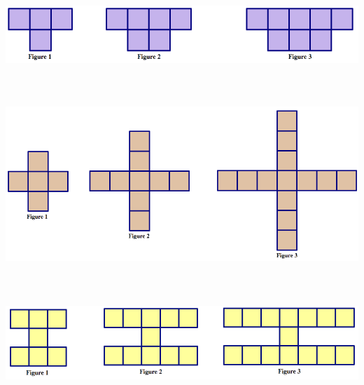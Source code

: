\bigskip


\begin{problem}\ 

\begin{center}
\includegraphics[height=2.5cm]{pattern3}
\end{center}

\end{problem}

\newpage

\begin{problem}\ 

\begin{center}
\includegraphics[height=6cm]{pattern4}
\end{center}

\end{problem}

\bigskip


\begin{problem}\ 

\begin{center}
\includegraphics[height=3.25cm]{pattern5}
\end{center}

\end{problem}



\bigskip


